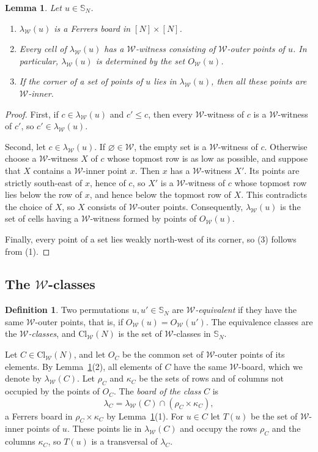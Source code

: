 \documentclass[11pt]{amsart}
\newtheorem{lemma}[theorem]{Lemma}
\theoremstyle{definition}
\newtheorem{definition}[theorem]{Definition}
\theoremstyle{remark}
\newcommand{\bS}{\mathbb{S}}
\newcommand{\Cl}{\mathrm{Cl}}
\newcommand{\cW}{\mathcal{W}}
\begin{document}
\begin{lemma}\label{lem:bw}
Let $u\in\bS_N$.
\begin{enumerate}
\item $\lambda_\cW(u)$ is a Ferrers board in $[N]\times[N]$.
\item Every cell of $\lambda_\cW(u)$ has a $\cW$-witness consisting of $\cW$-outer points of $u$. In particular, $\lambda_\cW(u)$ is determined by the set $O_\cW(u)$.
\item If the corner of a set of points of $u$ lies in $\lambda_\cW(u)$, then all these points are $\cW$-inner.
\end{enumerate}
\end{lemma}

\begin{proof}
First, if $c\in\lambda_\cW(u)$ and $c'\le c$, then every $\cW$-witness of $c$ is a $\cW$-witness of $c'$, so $c'\in\lambda_\cW(u)$.

Second, let $c\in\lambda_\cW(u)$. If $\varnothing\in\cW$, the empty set is a $\cW$-witness of $c$. Otherwise choose a $\cW$-witness $X$ of $c$ whose topmost row is as low as possible, and suppose that $X$ contains a $\cW$-inner point $x$. Then $x$ has a $\cW$-witness $X'$. Its points are strictly south-east of $x$, hence of $c$, so $X'$ is a $\cW$-witness of $c$ whose topmost row lies below the row of $x$, and hence below the topmost row of $X$. This contradicts the choice of $X$, so $X$ consists of $\cW$-outer points. Consequently, $\lambda_\cW(u)$ is the set of cells having a $\cW$-witness formed by points of $O_\cW(u)$.

Finally, every point of a set lies weakly north-west of its corner, so (3) follows from (1).
\end{proof}

\subsection{The \texorpdfstring{$\cW$}{W}-classes}\label{sec:classes}

\begin{definition}\label{def:class}
Two permutations $u,u'\in\bS_N$ are \emph{$\cW$-equivalent} if they have the same $\cW$-outer points, that is, if $O_\cW(u)=O_\cW(u')$. The equivalence classes are the \emph{$\cW$-classes}, and $\Cl_\cW(N)$ is the set of $\cW$-classes in $\bS_N$.
\end{definition}

Let $C\in\Cl_\cW(N)$, and let $O_C$ be the common set of $\cW$-outer points of its elements. By Lemma~\ref{lem:bw}(2), all elements of $C$ have the same $\cW$-board, which we denote by $\lambda_\cW(C)$. Let $\rho_C$ and $\kappa_C$ be the sets of rows and of columns not occupied by the points of $O_C$. The \emph{board of the class} $C$ is
\[
\lambda_C=\lambda_\cW(C)\cap(\rho_C\times\kappa_C),
\]
a Ferrers board in $\rho_C\times\kappa_C$ by Lemma~\ref{lem:bw}(1). For $u\in C$ let $T(u)$ be the set of $\cW$-inner points of $u$. These points lie in $\lambda_\cW(C)$ and occupy the rows $\rho_C$ and the columns $\kappa_C$, so $T(u)$ is a transversal of $\lambda_C$.
\end{document}
